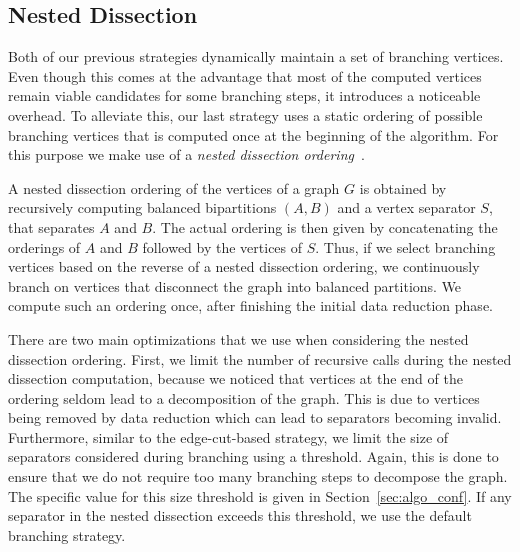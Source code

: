\documentclass[a4paper,UKenglish,cleveref, autoref, thm-restate]{lipics-v2021}
\begin{document}
\subsection{Nested Dissection}
Both of our previous strategies dynamically maintain a set of branching vertices.
Even though this comes at the advantage that most of the computed vertices remain viable candidates for some branching steps, it introduces a noticeable overhead.
To alleviate this, our last strategy uses a static ordering of possible branching vertices that is computed once at the beginning of the algorithm.
For this purpose we make use of a \emph{nested dissection ordering}~\cite{george1973nested}.

A nested dissection ordering of the vertices of a graph $G$ is obtained by recursively computing balanced bipartitions $(A,B)$ and a vertex separator $S$, that separates $A$ and $B$.
The actual ordering is then given by concatenating the orderings of $A$ and $B$ followed by the vertices of $S$.
Thus, if we select branching vertices based on the reverse of a nested dissection
ordering, we continuously branch on vertices that disconnect the graph into balanced partitions. 
We compute such an ordering once, after finishing the initial data reduction phase.

There are two main optimizations that we use when considering the nested dissection ordering.
First, we limit the number of recursive calls during the nested dissection
computation, because we noticed that vertices at the end of the ordering seldom lead to a decomposition of the graph. 
This is due to vertices being removed by data reduction which can lead to separators becoming invalid.
Furthermore, similar to the edge-cut-based strategy, we limit the size of
separators considered during branching using a threshold.
Again, this is done to ensure that we do not require too many branching steps to decompose the graph.
The specific value for this size threshold is given in Section~\ref{sec:algo_conf}.
If any separator in the nested dissection exceeds this threshold, we use the default branching strategy.
\end{document}
